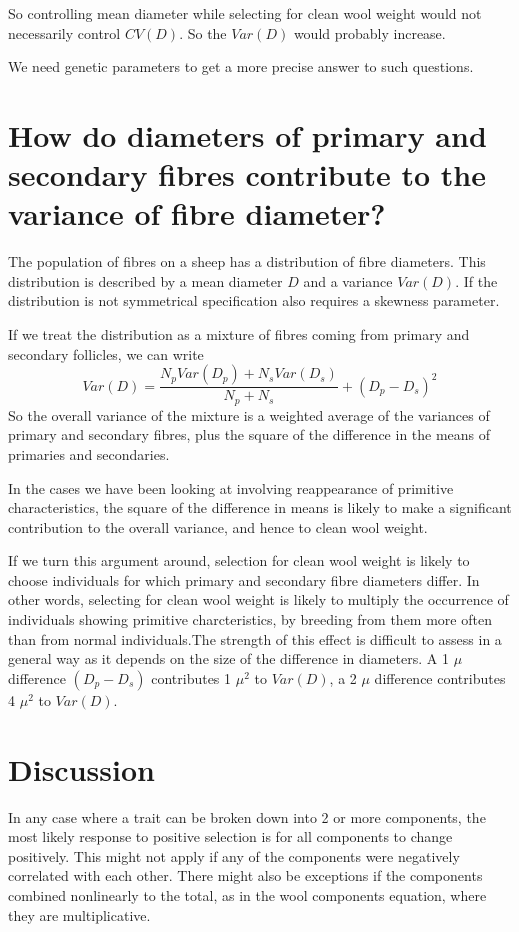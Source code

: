 \documentclass[titlepage]{article}  %
\begin{document}
So controlling mean diameter while selecting for clean wool weight would not necessarily control $CV(D)$. So the $Var{(D)}$ would probably increase.

We need genetic parameters to get a more precise answer to such questions.

\section{ How do diameters of primary and secondary fibres contribute to the variance of fibre diameter?}

The population of fibres on a sheep has a distribution of fibre diameters. This distribution is described by a mean diameter $D$ and a variance $Var{(D)}$. If the distribution is not symmetrical specification also requires a skewness parameter.

If we treat the distribution as a mixture of fibres coming from primary and secondary follicles, we can write
\begin{displaymath}
Var{(D)} = \frac{N_{p} Var{(D_{p})} + N_{s} Var{(D_{s})}}{N_{p} + N_{s}} + (D_{p} - D_{s})^{2}
\end{displaymath}
So the overall variance of the mixture is a weighted average of the variances of primary and secondary fibres, plus the square of the difference in the means of primaries and secondaries. 

In the cases we have been looking at involving  reappearance of primitive characteristics, the square of the difference in means is likely to make a significant contribution to the overall variance, and hence to clean wool weight. 


If we turn this argument around, selection for clean wool weight is likely to choose individuals for which primary and secondary fibre diameters differ. In other words, selecting for clean wool weight is likely to multiply the occurrence of individuals showing primitive charcteristics, by breeding from them more often than from normal individuals.The strength of this effect is difficult to assess in a general way as it depends on the size of the difference in diameters.  A 1 $\mu$ difference $(D_{p} - D_{s})$ contributes 1 $\mu^{2}$ to $Var{(D)}$, a 2 $\mu$ difference contributes 4 $\mu^{2}$ to $Var{(D)}$. 

\section{Discussion}
In any case where a trait can be broken down into 2 or more components, the most likely response to positive selection is for all components to change positively. This might not apply if any of the components were negatively correlated with each other.  There might also be exceptions if the components combined nonlinearly to the total, as in the wool components equation, where they are multiplicative. 
\end{document}
